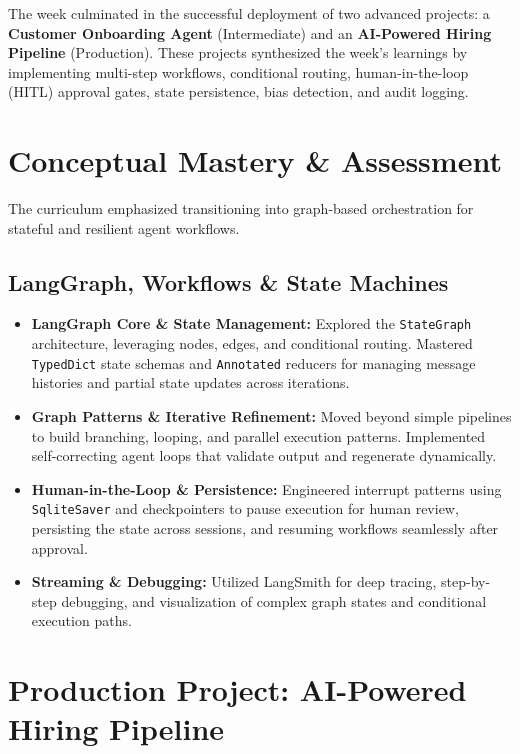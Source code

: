 \documentclass[12pt, a4paper]{article}
\begin{document}
The week culminated in the successful deployment of two advanced projects: a \textbf{Customer Onboarding Agent} (Intermediate) and an \textbf{AI-Powered Hiring Pipeline} (Production). These projects synthesized the week's learnings by implementing multi-step workflows, conditional routing, human-in-the-loop (HITL) approval gates, state persistence, bias detection, and audit logging.

\section{Conceptual Mastery \& Assessment}
The curriculum emphasized transitioning into graph-based orchestration for stateful and resilient agent workflows.

\subsection{LangGraph, Workflows \& State Machines}
\begin{itemize}[label=\textcolor{secondary}{$\bullet$}]
    \item \textbf{LangGraph Core \& State Management:} Explored the \texttt{StateGraph} architecture, leveraging nodes, edges, and conditional routing. Mastered \texttt{TypedDict} state schemas and \texttt{Annotated} reducers for managing message histories and partial state updates across iterations.
    \item \textbf{Graph Patterns \& Iterative Refinement:} Moved beyond simple pipelines to build branching, looping, and parallel execution patterns. Implemented self-correcting agent loops that validate output and regenerate dynamically.
    \item \textbf{Human-in-the-Loop \& Persistence:} Engineered interrupt patterns using \texttt{SqliteSaver} and checkpointers to pause execution for human review, persisting the state across sessions, and resuming workflows seamlessly after approval.
    \item \textbf{Streaming \& Debugging:} Utilized LangSmith for deep tracing, step-by-step debugging, and visualization of complex graph states and conditional execution paths.
\end{itemize}

\newpage

\section{Production Project: AI-Powered Hiring Pipeline}
\end{document}

